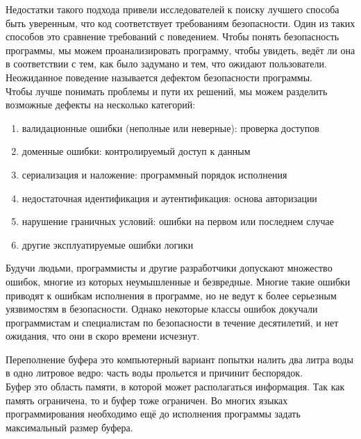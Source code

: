 Недостатки такого подхода привели исследователей к поиску лучшего способа быть уверенным, что код соответствует требованиям безопасности. Один из таких способов это сравнение требований с поведением. Чтобы понять безопасность программы, мы можем проанализировать программу, чтобы увидеть, ведёт ли она в соответствии с тем, как было задумано и тем, что ожидают пользователи. Неожиданное поведение называется дефектом безопасности программы. \\

Чтобы лучше понимать проблемы и пути их решений, мы можем разделить возможные дефекты на несколько категорий: \\

\begin{enumerate}
  \item валидационные ошибки (неполные или неверные): проверка доступов
  \item доменные ошибки: контролируемый доступ к данным
  \item сериализация и наложение: программный порядок исполнения
  \item недостаточная идентификация и аутентификация: основа авторизации
  \item нарушение граничных условий: ошибки на первом или последнем случае
  \item другие эксплуатируемые ошибки логики
\end{enumerate}


Будучи людьми, программисты и другие разработчики допускают множество ошибок, многие из которых неумышленные и безвредные. Многие такие ошибки приводят к ошибкам исполнения в программе, но не ведут к более серьезным уязвимостям в безопасности. Однако некоторые классы ошибок докучали программистам и специалистам по безопасности в течение десятилетий, и нет ожидания, что они в скоро времени исчезнут. \\


Переполнение буфера это компьютерный вариант попытки налить два литра воды в одно литровое ведро: часть воды прольется и причинит беспорядок. \\

Буфер это область памяти, в которой может располагаться информация. Так как память ограничена, то и буфер тоже ограничен. Во многих языках программирования необходимо ещё до исполнения программы задать максимальный размер буфера. \\

